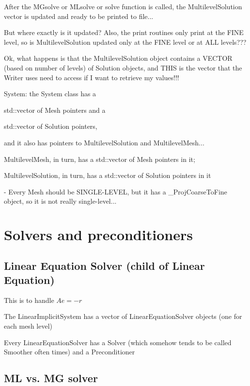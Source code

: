 \documentclass[10pt]{book}
\begin{document}
  
     After the MGsolve or MLsolve or solve function is called,
   the MultilevelSolution vector is updated and ready to be printed to file...
   
   But where exactly is it updated?
   Also, the print routines only print at the FINE level,
   so is MultilevelSolution updated only at the FINE level or at ALL levels???
   
   Ok, what happens is that the MultilevelSolution object contains a VECTOR (based on number of levels) of Solution objects,
   and THIS is the vector that the Writer uses need to access if I want to retrieve my values!!!
   
   
   System: the System class has a 
   
   std::vector of Mesh pointers and a 
   
   std::vector of Solution pointers,
   
   and it also has pointers to MultilevelSolution and MultilevelMesh...
   
   MultilevelMesh, in turn, has a std::vector of Mesh pointers in it;
   
   MultilevelSolution, in turn, has a std::vector of Solution pointers in it
   
   
   - Every Mesh should be SINGLE-LEVEL, but it has a \_ProjCoarseToFine object, so it is not really single-level...
      

\chapter{Solvers and preconditioners}



 \section{Linear Equation Solver (child of Linear Equation)}
 
 This is to handle $ A e = - r $
 
 The LinearImplicitSystem has a vector of LinearEquationSolver objects (one for each mesh level)
 
 Every LinearEquationSolver has a Solver (which somehow tends to be called Smoother often times) and a Preconditioner
 
 
  
 \section{ML vs. MG solver}
\end{document}
